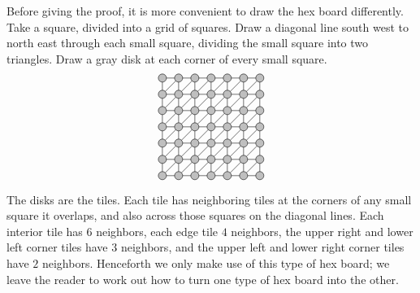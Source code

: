 Before giving the proof, it is more convenient to draw the hex board differently.
Take a square, divided into a grid of squares.
Draw a diagonal line south west to north east through each small square, dividing the small square into two triangles.
Draw a gray disk at each corner of every small square.
\[
\begin{tikzpicture}[scale=.5]
\draw (0,0) grid (6,6);
\foreach \i in {0,...,5}
{
	\foreach \j in {0,...,5}
	{
		\draw (\i,\j) -- ({1+\i},{1+\j});
	}
}
\foreach \i in {0,...,6}
{
	\foreach \j in {0,...,6}
	{
		\draw[black,fill=gray!50] (\i,\j) circle (.25cm);
	}
}
\end{tikzpicture}
\]
The disks are the tiles.
Each tile has neighboring tiles at the corners of any small square it overlaps, and also across those squares on the diagonal lines.
Each interior tile has \(6\) neighbors, each edge tile \(4\) neighbors, the upper right and lower left corner tiles have \(3\) neighbors, and the upper left and lower right corner tiles have \(2\) neighbors.
Henceforth we only make use of this type of hex board; we leave the reader to work out how to turn one type of hex board into the other.
